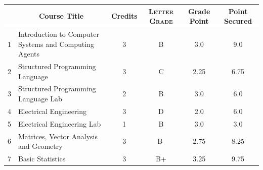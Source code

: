 \documentclass[11pt]{article}
\newcommand*{\numtwo}[1]{\pgfmathprintnumber[
                    fixed, precision=2, fixed zerofill=true]{#1}}
\begin{document}
                \begin{center}
                    \renewcommand{\arraystretch}{1.08}
                    
                \begin{tabular}{|c|l|c|>{\scshape}c|c|c|}
                \hline  \rule[-1ex]{0pt}{3.5ex} {\centering{\bf Course Code}} &  \multicolumn{1}{c|}{\textbf{Course Title}}  & {\bf Credits} & {\bf Letter Grade} & {\bf Grade Point} & {\bf Point Secured}  \\ 
                \hline   1 &  Introduction to Computer Systems and Computing Agents		 & 3 & B & 3.0 & 9.0 \\ %
                \hline   2 &  Structured Programming Language		 & 3 & C & 2.25 & 6.75 \\ %
                \hline   3 &  Structured Programming Language Lab		 & 2 & B & 3.0 & 6.0 \\ %
                \hline   4 &  Electrical Engineering		 & 3 & D & 2.0 & 6.0 \\ %
                \hline   5 &  Electrical Engineering Lab		 & 1 & B & 3.0 & 3.0 \\ %
                \hline   6 &  Matrices, Vector Analysis and Geometry		 & 3 & B- & 2.75 & 8.25 \\ %
                \hline   7 &  Basic Statistics		 & 3 & B+ & 3.25 & 9.75 \\ %

\hline                %
                \end{tabular}
                \end{center}
                \renewcommand{\arraystretch}{1.03}
\end{document}
